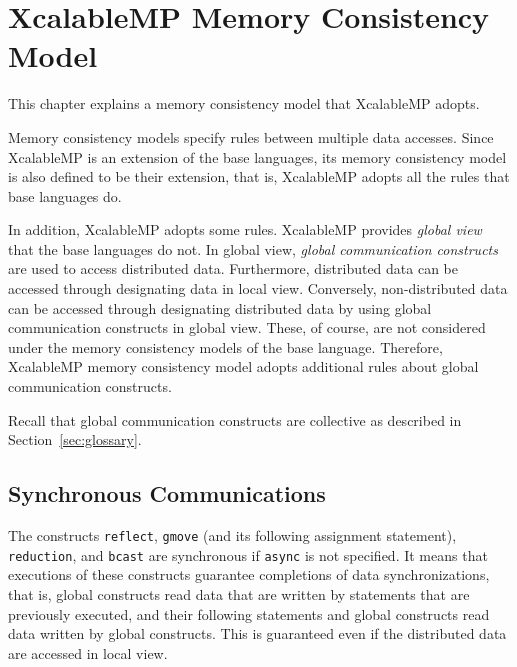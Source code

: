 

\chapter{XcalableMP Memory Consistency Model}



This chapter explains a memory consistency model that XcalableMP adopts.

Memory consistency models specify rules between multiple data
accesses.  Since XcalableMP is an extension of the base languages, its
memory consistency model is also defined to be their extension, that
is, XcalableMP adopts all the rules that base languages do.

In addition, XcalableMP adopts some rules.  XcalableMP provides
\emph{global view} that the base languages do not.  In global view,
\emph{global communication constructs} are used to access distributed
data.  Furthermore, distributed data can be accessed through
designating data in local view.  Conversely, non-distributed data can
be accessed through designating distributed data by using global
communication constructs in global view.  These, of course, are not
considered under the memory consistency models of the base language.
Therefore, XcalableMP memory consistency model adopts additional rules
about global communication constructs.

Recall that global communication constructs are collective as
described in Section~\ref{sec:glossary}.

\section{Synchronous Communications}

The constructs \texttt{reflect}, \texttt{gmove} (and its following
assignment statement), \texttt{reduction}, and \texttt{bcast} are
synchronous if \texttt{async} is not specified.  It means that
executions of these constructs guarantee completions of data
synchronizations, that is, global constructs read data that are
written by statements that are previously executed, and their
following statements and global constructs read data written by global
constructs.  This is guaranteed even if the distributed data are
accessed in local view.

